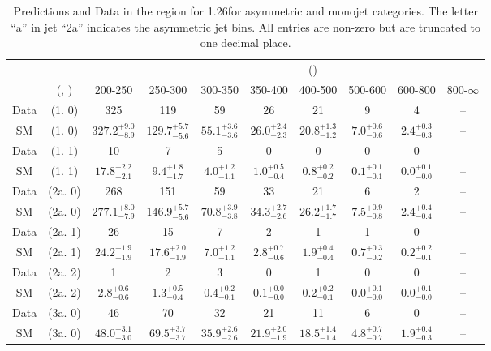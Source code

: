 \begin{table}[h!]
\tiny
\centering
\caption{Predictions and Data in the \mmj region for 1.26\ifb for asymmetric and monojet categories. The letter ``a'' in jet \eg ``2a''  indicates the asymmetric jet bins. All entries are non-zero but are truncated to one decimal place.\label{tab:predall_mumu_comb_asym}}
\begin{tabular}
{cccccccccc}
	\hline\hline
&	&	& \multicolumn{8}{c}{\scalht (\gev)}\\ 
	&	 (\njet, \nb) & 200-250 & 250-300 & 300-350 & 350-400 & 400-500 & 500-600 & 600-800 & 800-$\infty$ \\ [0.8ex] 
\hline
	Data & (1. 0) & 325 & 119 & 59 & 26 & 21 & 9 & 4 & -- \\[0.5ex] 
	SM & (1. 0) & $327.2^{+ 9.0 }_{- 8.9 }$ & $129.7^{+ 5.7 }_{- 5.6 }$ & $55.1^{+ 3.6 }_{- 3.6 }$ & $26.0^{+ 2.4 }_{- 2.3 }$ & $20.8^{+ 1.3 }_{- 1.2 }$ & $7.0^{+ 0.6 }_{- 0.6 }$ & $2.4^{+ 0.3 }_{- 0.3 }$ & -- \\[0.5ex] 
	Data & (1. 1) & 10 & 7 & 5 & 0 & 0 & 0 & 0 & -- \\[0.5ex] 
	SM & (1. 1) & $17.8^{+ 2.2 }_{- 2.1 }$ & $9.4^{+ 1.8 }_{- 1.7 }$ & $4.0^{+ 1.2 }_{- 1.1 }$ & $1.0^{+ 0.5 }_{- 0.4 }$ & $0.8^{+ 0.2 }_{- 0.2 }$ & $0.1^{+ 0.1 }_{- 0.1 }$ & $0.0^{+ 0.1 }_{- 0.0 }$ & -- \\[0.5ex] 
	Data & (2a. 0) & 268 & 151 & 59 & 33 & 21 & 6 & 2 & -- \\[0.5ex] 
	SM & (2a. 0) & $277.1^{+ 8.0 }_{- 7.9 }$ & $146.9^{+ 5.7 }_{- 5.6 }$ & $70.8^{+ 3.9 }_{- 3.8 }$ & $34.3^{+ 2.7 }_{- 2.6 }$ & $26.2^{+ 1.7 }_{- 1.7 }$ & $7.5^{+ 0.9 }_{- 0.8 }$ & $2.4^{+ 0.4 }_{- 0.4 }$ & -- \\[0.5ex] 
	Data & (2a. 1) & 26 & 15 & 7 & 2 & 1 & 1 & 0 & -- \\[0.5ex] 
	SM & (2a. 1) & $24.2^{+ 1.9 }_{- 1.9 }$ & $17.6^{+ 2.0 }_{- 1.9 }$ & $7.0^{+ 1.2 }_{- 1.1 }$ & $2.8^{+ 0.7 }_{- 0.6 }$ & $1.9^{+ 0.4 }_{- 0.4 }$ & $0.7^{+ 0.3 }_{- 0.2 }$ & $0.2^{+ 0.2 }_{- 0.1 }$ & -- \\[0.5ex] 
	Data & (2a. 2) & 1 & 2 & 3 & 0 & 1 & 0 & 0 & -- \\[0.5ex] 
	SM & (2a. 2) & $2.8^{+ 0.6 }_{- 0.6 }$ & $1.3^{+ 0.5 }_{- 0.4 }$ & $0.4^{+ 0.2 }_{- 0.1 }$ & $0.1^{+ 0.0 }_{- 0.0 }$ & $0.2^{+ 0.2 }_{- 0.1 }$ & $0.0^{+ 0.1 }_{- 0.0 }$ & $0.0^{+ 0.1 }_{- 0.0 }$ & -- \\[0.5ex] 
	Data & (3a. 0) & 46 & 70 & 32 & 21 & 11 & 6 & 0 & -- \\[0.5ex] 
	SM & (3a. 0) & $48.0^{+ 3.1 }_{- 3.0 }$ & $69.5^{+ 3.7 }_{- 3.7 }$ & $35.9^{+ 2.6 }_{- 2.6 }$ & $21.9^{+ 2.0 }_{- 1.9 }$ & $18.5^{+ 1.4 }_{- 1.4 }$ & $4.8^{+ 0.7 }_{- 0.7 }$ & $1.9^{+ 0.4 }_{- 0.3 }$ & -- \\[0.5ex] 

\end{tabular}
\end{table}
